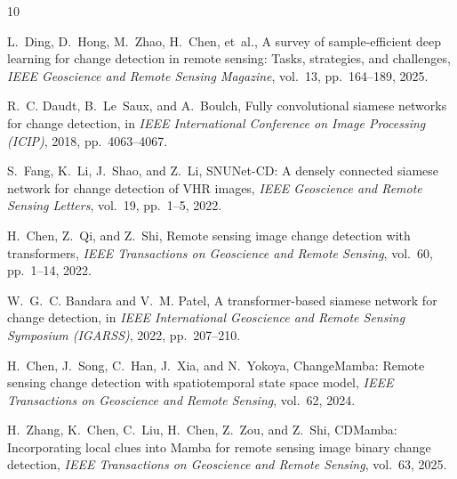 \documentclass[final,5p,times,twocolumn]{elsarticle}
\begin{document}

\begin{thebibliography}{10}

L.~Ding, D.~Hong, M.~Zhao, H.~Chen, et~al.,
\newblock A survey of sample-efficient deep learning for change detection in remote sensing: Tasks, strategies, and challenges,
\newblock \emph{IEEE Geoscience and Remote Sensing Magazine}, vol.~13, pp.~164--189, 2025.

R.~C. Daudt, B.~Le~Saux, and A.~Boulch,
\newblock Fully convolutional siamese networks for change detection,
\newblock in \emph{IEEE International Conference on Image Processing (ICIP)}, 2018, pp.~4063--4067.

S.~Fang, K.~Li, J.~Shao, and Z.~Li,
\newblock SNUNet-CD: A densely connected siamese network for change detection of VHR images,
\newblock \emph{IEEE Geoscience and Remote Sensing Letters}, vol.~19, pp.~1--5, 2022.

H.~Chen, Z.~Qi, and Z.~Shi,
\newblock Remote sensing image change detection with transformers,
\newblock \emph{IEEE Transactions on Geoscience and Remote Sensing}, vol.~60, pp.~1--14, 2022.

W.~G.~C. Bandara and V.~M. Patel,
\newblock A transformer-based siamese network for change detection,
\newblock in \emph{IEEE International Geoscience and Remote Sensing Symposium (IGARSS)}, 2022, pp.~207--210.

H.~Chen, J.~Song, C.~Han, J.~Xia, and N.~Yokoya,
\newblock ChangeMamba: Remote sensing change detection with spatiotemporal state space model,
\newblock \emph{IEEE Transactions on Geoscience and Remote Sensing}, vol.~62, 2024.

H.~Zhang, K.~Chen, C.~Liu, H.~Chen, Z.~Zou, and Z.~Shi,
\newblock CDMamba: Incorporating local clues into Mamba for remote sensing image binary change detection,
\newblock \emph{IEEE Transactions on Geoscience and Remote Sensing}, vol.~63, 2025.

\end{thebibliography}
\end{document}
